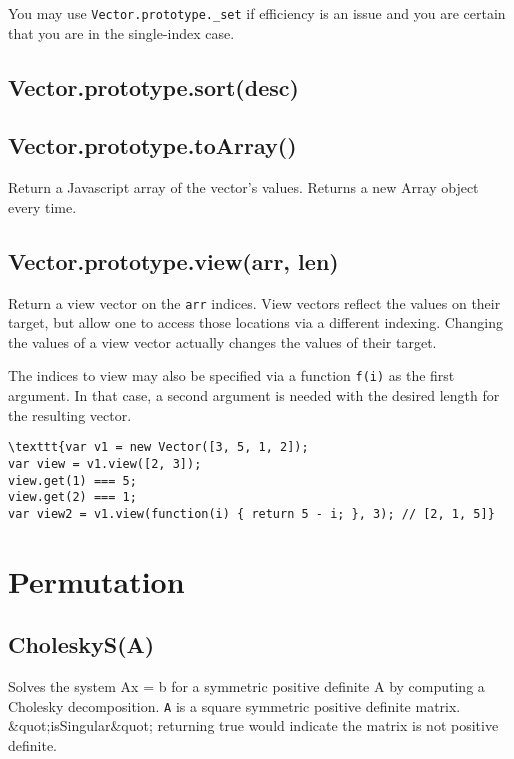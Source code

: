 \documentclass{article}
\begin{document}
You may use \texttt{Vector.prototype.\_set} if efficiency is an issue and you are certain that
you are in the single-index case.


    \subsection*{Vector.prototype.sort(desc)}

    \subsection*{Vector.prototype.toArray()}
    Return a Javascript array of the vector's values. Returns a new
Array object every time.


    \subsection*{Vector.prototype.view(arr, len)}
    Return a view vector on the \texttt{arr} indices. View vectors reflect the values on their
target, but allow one to access those locations via a different indexing.
Changing the values of a view vector actually changes the values of their target.


The indices to view may also be specified via a function \texttt{f(i)} as the first argument.
In that case, a second argument is needed with the desired length for the resulting vector.


\begin{lstlisting}
\texttt{var v1 = new Vector([3, 5, 1, 2]);
var view = v1.view([2, 3]);
view.get(1) === 5;
view.get(2) === 1;
var view2 = v1.view(function(i) { return 5 - i; }, 3); // [2, 1, 5]}\end{lstlisting}

  \section{Permutation}
    \subsection*{CholeskyS(A)}
    Solves the system Ax = b for a symmetric positive definite A by computing
a Cholesky decomposition. \texttt{A} is a square symmetric positive definite matrix.
\&quot;isSingular\&quot; returning true would indicate the matrix is not positive definite.
\end{document}
